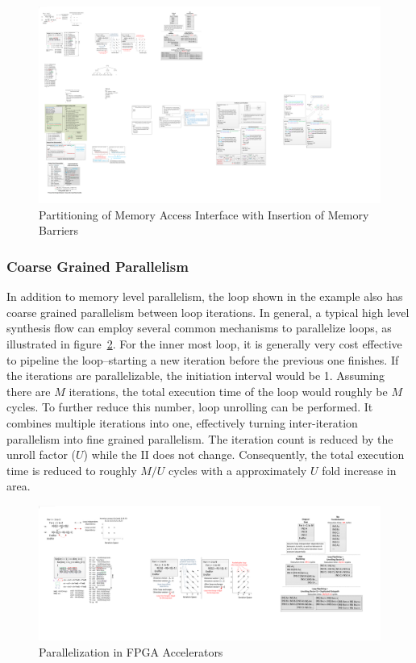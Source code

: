 \begin{figure}[htp]
\begin{center}
\includegraphics[width=0.9\linewidth]{chap6fig/memOrMemBarrier.pdf}
\caption{Partitioning of Memory Access Interface with Insertion of Memory Barriers 
\label{fig:withOrWithoutBarrier}}
\end{center}
\end{figure}


\subsubsection{Coarse Grained Parallelism}


In addition to memory level parallelism, the loop shown in the example also has coarse grained parallelism between loop iterations. In general, a typical high level synthesis flow can employ several common mechanisms to parallelize loops, as illustrated in figure~\ref{fig:fpgaparal}. 
For the inner most
loop, it is generally very cost effective to pipeline the loop--starting a new iteration before the previous one finishes. If
the iterations are parallelizable, the initiation interval would be 1.
Assuming there are $M$ iterations, the total execution time of the loop
would roughly be $M$ cycles. To further reduce this number, loop unrolling
can be performed. It combines multiple iterations into one, effectively
turning inter-iteration parallelism into fine grained parallelism. 
The iteration count is reduced by the unroll factor ($U$) while the II does not change. Consequently, the total execution time is reduced to roughly $M/U$ cycles with a approximately $U$ fold increase in area. 

\begin{figure}[htp]
\begin{center}
\includegraphics[width=0.8\linewidth]{chap6fig/fpgaParallel.pdf}
\caption{Parallelization in FPGA Accelerators
\label{fig:fpgaparal}}
\end{center}
\end{figure}

